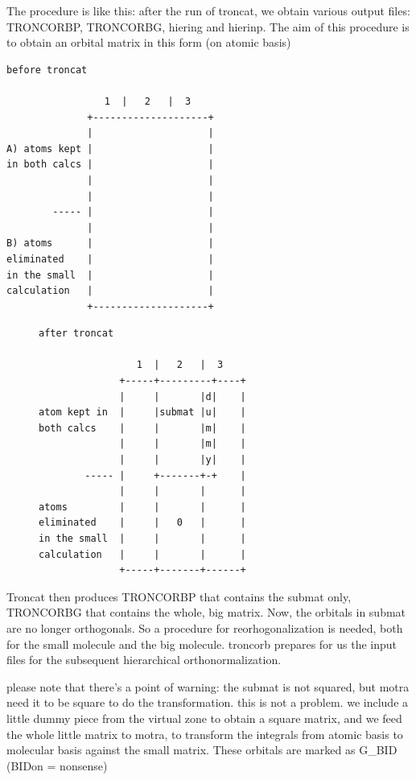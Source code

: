\documentclass[a4paper,11pt]{report}
\begin{document}
The procedure is like this: after the run of troncat, we obtain various
output files: TRONCORBP, TRONCORBG, hiering and hierinp.
The aim of this procedure is to obtain an orbital matrix in this form (on
atomic basis)

\begin{verbatim}
before troncat

                 1  |   2   |  3
              +--------------------+
              |                    |
A) atoms kept |                    |
in both calcs |                    |
              |                    |
              |                    |
        ----- |                    |
              |                    |
B) atoms      |                    |
eliminated    |                    |
in the small  |                    |
calculation   |                    |
              +--------------------+
\end{verbatim}

\begin{figure}[ht]
\begin{verbatim}
after troncat

                 1  |   2   |  3
              +-----+---------+----+
              |     |       |d|    |
atom kept in  |     |submat |u|    |
both calcs    |     |       |m|    |
              |     |       |m|    |
              |     |       |y|    |
        ----- |     +-------+-+    |
              |     |       |      |
atoms         |     |       |      |
eliminated    |     |   0   |      |
in the small  |     |       |      |
calculation   |     |       |      |
              +-----+-------+------+
\end{verbatim}
\end{figure}

Troncat then produces TRONCORBP that contains the submat only, TRONCORBG
that contains the whole, big matrix.
Now, the orbitals in submat are no longer orthogonals. So a procedure for
reorhogonalization is needed, both for the small molecule and the big
molecule. troncorb prepares for us the input files for the subsequent
hierarchical orthonormalization.

please note that there's a point of warning: the submat is not squared, but
motra need it to be square to do the transformation. this is not a problem.
we include a little dummy piece from the virtual zone to obtain a square
matrix, and we feed the whole little matrix to motra, to transform the
integrals from atomic basis to molecular basis against the small matrix.
These orbitals are marked as G\_BID (BIDon = nonsense)
\end{document}
